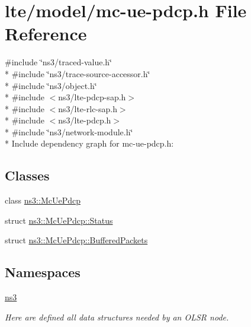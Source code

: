 \hypertarget{lte_2model_2mc-ue-pdcp_8h}{}\section{lte/model/mc-\/ue-\/pdcp.h File Reference}
\label{lte_2model_2mc-ue-pdcp_8h}
{\ttfamily \#include \char`\"{}ns3/traced-\/value.\+h\char`\"{}}\\*
{\ttfamily \#include \char`\"{}ns3/trace-\/source-\/accessor.\+h\char`\"{}}\\*
{\ttfamily \#include \char`\"{}ns3/object.\+h\char`\"{}}\\*
{\ttfamily \#include $<$ns3/lte-\/pdcp-\/sap.\+h$>$}\\*
{\ttfamily \#include $<$ns3/lte-\/rlc-\/sap.\+h$>$}\\*
{\ttfamily \#include $<$ns3/lte-\/pdcp.\+h$>$}\\*
{\ttfamily \#include \char`\"{}ns3/network-\/module.\+h\char`\"{}}\\*
Include dependency graph for mc-\/ue-\/pdcp.h\+:
\subsection*{Classes}
\begin{DoxyCompactItemize}
\item 
class \hyperlink{classns3_1_1McUePdcp}{ns3\+::\+Mc\+Ue\+Pdcp}
\item 
struct \hyperlink{structns3_1_1McUePdcp_1_1Status}{ns3\+::\+Mc\+Ue\+Pdcp\+::\+Status}
\item 
struct \hyperlink{structns3_1_1McUePdcp_1_1BufferedPackets}{ns3\+::\+Mc\+Ue\+Pdcp\+::\+Buffered\+Packets}
\end{DoxyCompactItemize}
\subsection*{Namespaces}
\begin{DoxyCompactItemize}
\item 
 \hyperlink{namespacens3}{ns3}
\begin{DoxyCompactList}\small\item\em Here are defined all data structures needed by an O\+L\+SR node. \end{DoxyCompactList}\end{DoxyCompactItemize}
